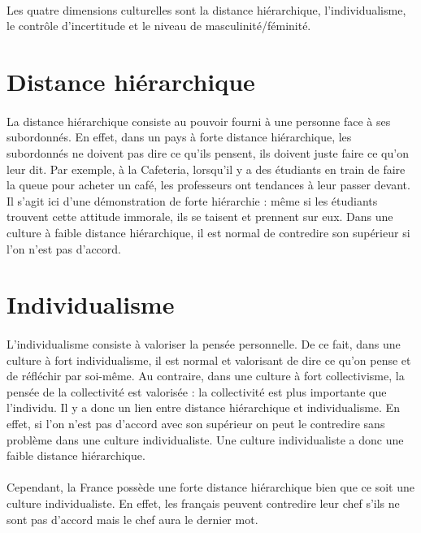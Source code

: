\paragraph{} Les quatre dimensions culturelles sont la distance hiérarchique,
l’individualisme, le contrôle d’incertitude et le niveau de
masculinité/féminité.

\section{Distance hiérarchique}

\paragraph{} La distance hiérarchique consiste au pouvoir fourni à une personne
face à ses subordonnés. En effet, dans un pays à forte distance hiérarchique,
les subordonnés ne doivent pas dire ce qu’ils pensent, ils doivent juste faire
ce qu’on leur dit. Par exemple, à la Cafeteria, lorsqu’il y a des étudiants en
train de faire la queue pour acheter un café, les professeurs ont tendances à
leur passer devant. Il s’agit ici d’une démonstration de forte hiérarchie :
même si les étudiants trouvent cette attitude immorale, ils se taisent et
prennent sur eux. Dans une culture à faible distance hiérarchique, il est
normal de contredire son supérieur si l’on n’est pas d’accord.

\section{Individualisme}

\paragraph{} L’individualisme consiste à valoriser la pensée personnelle. De ce
fait, dans une culture à fort individualisme, il est normal et valorisant de
dire ce qu’on pense et de réfléchir par soi-même. Au contraire, dans une
culture à fort collectivisme, la pensée de la collectivité est valorisée : la
collectivité est plus importante que l’individu. Il y a donc un lien entre
distance hiérarchique et individualisme. En effet, si l’on n’est pas d’accord
avec son supérieur on peut le contredire sans problème dans une culture
individualiste. Une culture individualiste a donc une faible distance
hiérarchique.

\paragraph{} Cependant, la France possède une forte distance hiérarchique bien
que ce soit une culture individualiste. En effet, les français peuvent
contredire leur chef s’ils ne sont pas d’accord mais le chef aura le dernier
mot.

